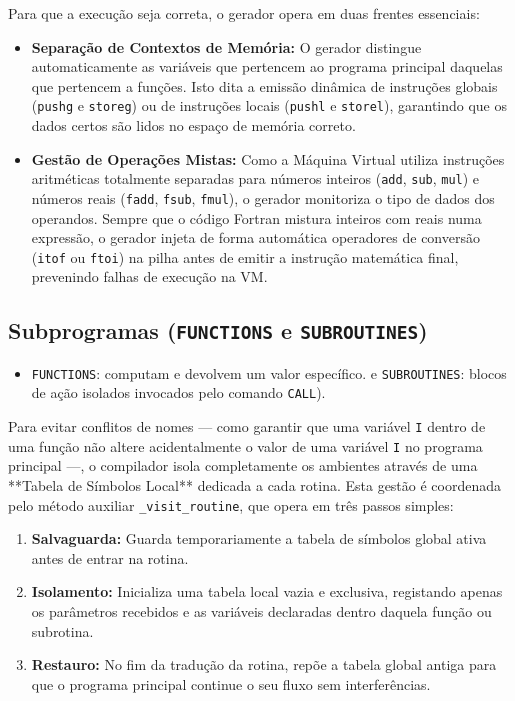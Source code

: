 \documentclass[12pt, a4paper]{article}
\begin{document}
Para que a execução seja correta, o gerador opera em duas frentes essenciais:
\begin{itemize}
    \item \textbf{Separação de Contextos de Memória:} O gerador distingue automaticamente as variáveis que pertencem ao programa principal daquelas que pertencem a funções. Isto dita a emissão dinâmica de instruções globais (\texttt{pushg} e \texttt{storeg}) ou de instruções locais (\texttt{pushl} e \texttt{storel}), garantindo que os dados certos são lidos no espaço de memória correto.
    \item \textbf{Gestão de Operações Mistas:} Como a Máquina Virtual utiliza instruções aritméticas totalmente separadas para números inteiros (\texttt{add}, \texttt{sub}, \texttt{mul}) e números reais (\texttt{fadd}, \texttt{fsub}, \texttt{fmul}), o gerador monitoriza o tipo de dados dos operandos. Sempre que o código Fortran mistura inteiros com reais numa expressão, o gerador injeta de forma automática operadores de conversão (\texttt{itof} ou \texttt{ftoi}) na pilha antes de emitir a instrução matemática final, prevenindo falhas de execução na VM.
\end{itemize}

\subsection{Subprogramas (\texttt{FUNCTIONS} e \texttt{SUBROUTINES})}
\begin{itemize}
    \item  \texttt{FUNCTIONS}: computam e devolvem um valor específico.
 e \texttt{SUBROUTINES}: blocos de ação isolados invocados pelo comando \texttt{CALL}). 
 \end{itemize}

Para evitar conflitos de nomes — como garantir que uma variável \texttt{I} dentro de uma função não altere acidentalmente o valor de uma variável \texttt{I} no programa principal —, o compilador isola completamente os ambientes através de uma **Tabela de Símbolos Local** dedicada a cada rotina. Esta gestão é coordenada pelo método auxiliar \texttt{\_visit\_routine}, que opera em três passos simples:
\begin{enumerate}
    \item \textbf{Salvaguarda:} Guarda temporariamente a tabela de símbolos global ativa antes de entrar na rotina.
    \item \textbf{Isolamento:} Inicializa uma tabela local vazia e exclusiva, registando apenas os parâmetros recebidos e as variáveis declaradas dentro daquela função ou subrotina.
    \item \textbf{Restauro:} No fim da tradução da rotina, repõe a tabela global antiga para que o programa principal continue o seu fluxo sem interferências.
\end{enumerate}
\end{document}
